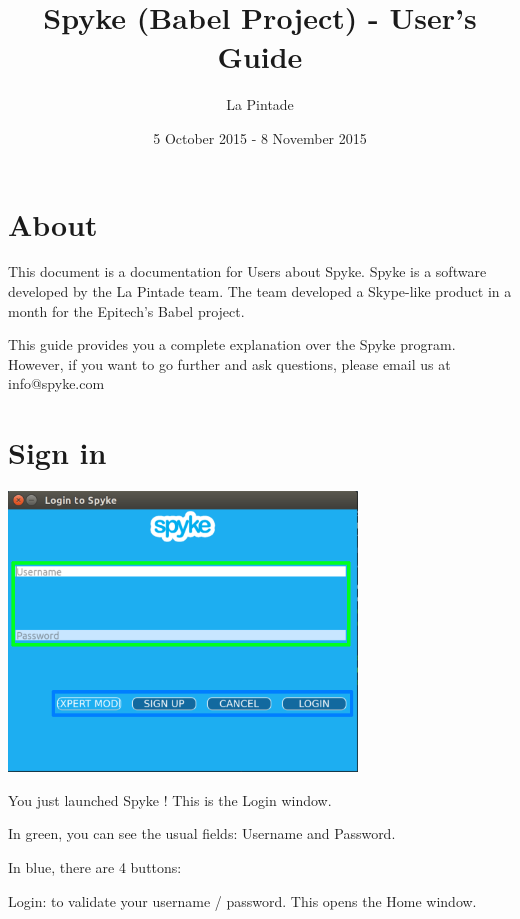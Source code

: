 \documentclass{article}
\title{Spyke (Babel Project) - User's Guide}
\author{La Pintade}
\date{5 October 2015 - 8 November 2015}
\begin{document}
  \maketitle
  \tableofcontents

  \newpage

  \section{About}
  This document is a documentation for Users about Spyke. Spyke is a software developed by the La Pintade team. The team developed a Skype-like product in a month for the Epitech's Babel project.

  \bigskip
  This guide provides you a complete explanation over the Spyke program. However, if you want to go further and ask questions, please email us at info@spyke.com

  \newpage

  \section{Sign in}
  \bigskip
  \includegraphics[width=350]{loginGuide}

  \bigskip
  You just launched Spyke ! This is the Login window.

  \bigskip
  In green, you can see the usual fields: Username and Password.

  \bigskip
  In blue, there are 4 buttons:

  Login: to validate your username / password. This opens the Home window.
\end{document}
